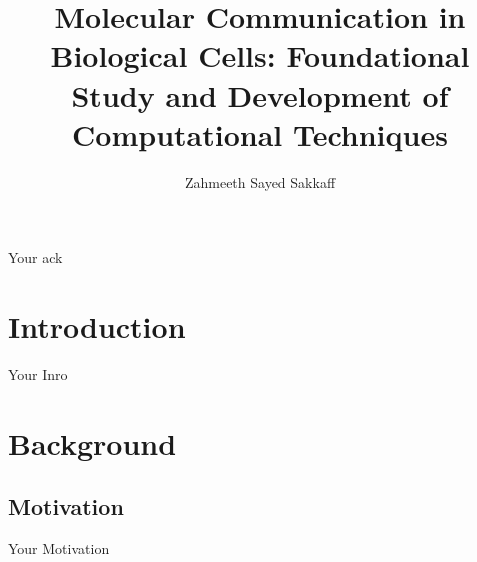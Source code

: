 \documentclass[print,phd_com]{nuthesis}
\begin{document}
\frontmatter
\title{Molecular Communication in Biological Cells: Foundational Study and Development of Computational Techniques }
\author{Zahmeeth Sayed Sakkaff}



\maketitle
%
%
%
%


\begin{acknowledgments}
Your ack
\end{acknowledgments}


\tableofcontents
\newpage
\listoffigures
\listoftables

\mainmatter
\chapter{Introduction}
\label{sec:Introduction}
\par Your Inro

\chapter{Background}
\section{Motivation}
\label{sec:motivation}
\par Your Motivation
\end{document}
